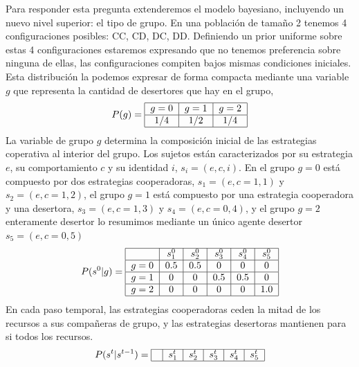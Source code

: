 \documentclass[a4paper,10pt]{article}
\begin{document}
{Para responder esta pregunta extenderemos el modelo bayesiano, incluyendo un nuevo nivel superior: el tipo de grupo.
En una población de tamaño 2 tenemos 4 configuraciones posibles: CC, CD, DC, DD.
Definiendo un prior uniforme sobre estas 4 configuraciones estaremos expresando que no tenemos preferencia sobre ninguna de ellas, las configuraciones compiten bajos mismas condiciones iniciales.
Esta distribución la podemos expresar de forma compacta mediante una variable $g$ que representa la cantidad de desertores que hay en el grupo,
%
\begin{align}
\centering
P(g) = \begin{tabular}{|c|c|c|c|}
        \hline
        $g=0$ & $g=1$ & $g=2$ \\ \hline
        $1/4$ & $1/2$ & $1/4$ \\ \hline
\end{tabular}
\end{align}
%
La variable de grupo $g$ determina la composición inicial de las estrategias coperativa al interior del grupo.
Los sujetos están caracterizados por su estrategia $e$, su comportamiento $c$ y su identidad $i$, $s_i=(e,c,i)$.
En el grupo $g=0$ está compuesto por dos estrategias cooperadoras, $s_1=(e,c=1,1)$ y $s_2=(e,c=1,2)$, el grupo $g=1$ está compuesto por una estrategia cooperadora y una desertora, $s_3=(e,c=1,3)$ y $s_4=(e,c=0,4)$, y el grupo $g=2$ enteramente desertor lo resumimos mediante un único agente desertor $s_5=(e,c=0,5)$
%
\begin{align}
\centering
P(s^0|g) = \begin{tabular}{|c|c|c|c|c|c|}
        \hline
        & $s^0_1$ & $s^0_2$ & $s^0_3$ &  $s^0_4$ & $s^0_5$ \\ \hline
       $g=0$ & $0.5$ & $0.5$ & $0$ &  $0$ & $0$  \\ \hline
       $g=1$ & $0$ & $0$ & $0.5$ & $0.5$ & $0$ \\ \hline
       $g=2$ & $0$ & $0$ & $0$ & $0$ & $1.0$ \\ \hline
\end{tabular}
\end{align}
%
En cada paso temporal, las estrategias cooperadoras ceden la mitad de los recursos a sus compañeras de grupo, y las estrategias desertoras mantienen para si todos los recursos.
%
\begin{align}
\centering
P(s^{t}|s^{t-1}) = \begin{tabular}{|c|c|c|c|c|c|}
        \hline
        & $s^t_1$ & $s^t_2$ & $s^t_3$ & $s^t_4$ & $s^t_5$ \\ \hline

\end{tabular}
\end{align}}
\end{document}
